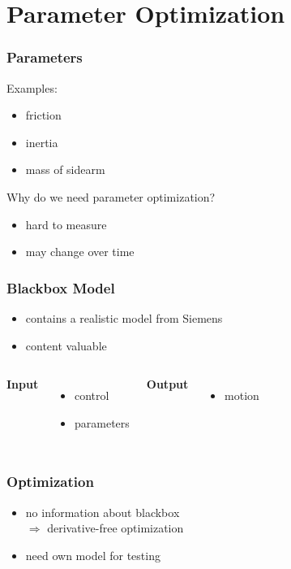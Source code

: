 \section{Parameter Optimization}

\begin{frame}[c]
\frametitle{Parameters}
Examples:
\begin{itemize}
	\item{friction}
	\item{inertia}
	\item{mass of sidearm}
\end{itemize}
\vspace{0.5cm}
Why do we need parameter optimization?
\begin{itemize}
	\item{hard to measure}
	\item{may change over time}
\end{itemize}
\end{frame}

\begin{frame}[c]
\frametitle{Blackbox Model}
\begin{itemize}
	\item{contains a realistic model from Siemens}
	\item{content valuable}
\end{itemize}
\vspace{0.5cm}
\begin{columns}[t]
		\textbf{Input}
		\begin{itemize}
			\item{control}
			\item{parameters}
		\end{itemize}
		\textbf{Output}
		\begin{itemize}
			\item{motion}
		\end{itemize}
\end{columns}
\end{frame}

\begin{frame}
\frametitle{Optimization}
\begin{itemize}
	\item{no information about blackbox \\ $\Rightarrow$ derivative-free optimization}
	\vspace{0.5cm}
	\item{need own model for testing}
\end{itemize}
\end{frame}

